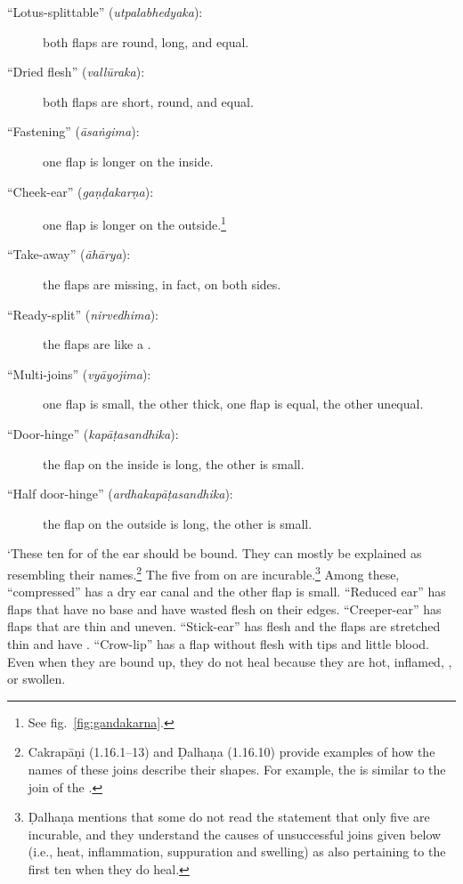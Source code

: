 \begin{translation}
\begin{description}
        \item[\mdseries``Lotus-splittable'' (\emph{utpalabhedyaka}):]
        both flaps are round, long, and equal.
        
        \item[\mdseries``Dried flesh'' (\emph{vallūraka}):]
        both flaps are short, round, and equal.
        
        \item[\mdseries``Fastening'' (\emph{āsaṅgima}):]
        one flap is longer on the inside.
        
        \item[\mdseries``Cheek-ear'' (\emph{gaṇḍakarṇa}):]
        one flap is longer on the outside.\footnote{See fig.~\ref{fig:gandakarna}.}
        
        \item[\mdseries``Take-away'' (\emph{āhārya}):]
        the flaps are missing, in fact, on both sides.
        
        \item[\mdseries``Ready-split'' (\emph{nirvedhima}):]
        the flaps are like a .
        
        \item[\mdseries``Multi-joins'' (\emph{vyāyojima}):]
        one flap is small, the other thick, one flap is equal, the other unequal.
        
        \item[\mdseries``Door-hinge'' (\emph{kapāṭasandhika}):]
        the flap on the inside is long, the other is small.
        
        \item[\mdseries``Half door-hinge'' (\emph{ardhakapāṭasandhika}):]
        the flap on the outside is long, the other is small.
    \end{description}
    
    `These ten  for  of the ear should be
    bound.  They can mostly be explained as resembling their names.\footnote{Cakrapāṇi (1.16.1–13) and Ḍalhaṇa (1.16.10) provide examples of how the names of these joins describe their shapes. For example, the  is similar to the join of the .}  The five from  on are incurable.\footnote{Ḍalhaṇa mentions that some do not read the statement that only five are incurable, and they understand the causes of unsuccessful joins given below (i.e., heat, inflammation, suppuration and swelling) as also pertaining to the first ten when they do heal.}  Among these, “compressed” has a dry ear canal and the other flap is small.   “Reduced ear” has 
    flaps that have no base and have wasted flesh on their edges. “Creeper-ear” has 
    flaps that are thin and uneven. “Stick-ear” has  flesh and the 
    flaps are stretched thin and have  .  “Crow-lip” 
    has a flap 
    without flesh with  tips and little blood. Even when 
    they are bound up, they do not heal because they are hot, inflamed, 
    , or swollen.
    

\end{translation}
